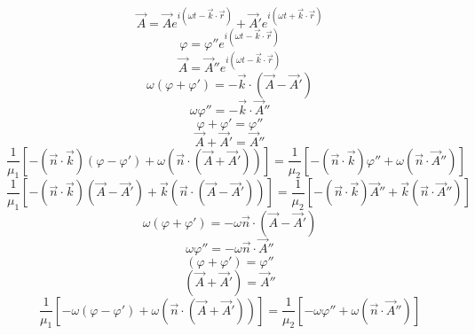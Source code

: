 \begin{equation}
    \vec{A}=\vec{A} e^{i(\omega t-\vec{k}\cdot\vec{r})}+\vec{A}' e^{i(\omega t+\vec{k}\cdot\vec{r})}
\end{equation}
\begin{equation}
    \varphi=\varphi''e^{i(\omega t-\vec{k}\cdot\vec{r})}
\end{equation}
\begin{equation}
    \vec{A}=\vec{A}''e^{i(\omega t-\vec{k}\cdot\vec{r})}
\end{equation}
\begin{equation}
    \omega(\varphi+\varphi')=-\vec{k}\cdot(\vec{A}-\vec{A}')
\end{equation}
\begin{equation}
    \omega\varphi''=-\vec{k}\cdot\vec{A}''
\end{equation}
\begin{equation}
    \varphi+\varphi'=\varphi''
\end{equation}
\begin{equation}
    \vec{A}+\vec{A}'=\vec{A}''
\end{equation}
\begin{equation}
    \frac{1}{\mu_1}[-(\vec{n}\cdot\vec{k})(\varphi-\varphi')+\omega(\vec{n}\cdot(\vec{A}+\vec{A}'))]=\frac{1}{\mu_2}[-(\vec{n}\cdot\vec{k})\varphi''+\omega(\vec{n}\cdot\vec{A}'')]
\end{equation}
\begin{equation}
    \frac{1}{\mu_1}[-(\vec{n}\cdot\vec{k})(\vec{A}-\vec{A}')+\vec{k}(\vec{n}\cdot(\vec{A}-\vec{A}'))]=\frac{1}{\mu_2}[-(\vec{n}\cdot\vec{k})\vec{A}''+\vec{k}(\vec{n}\cdot\vec{A}'')]
\end{equation}
\begin{equation}
    \omega(\varphi+\varphi')=-\omega\vec{n}\cdot(\vec{A}-\vec{A}')
\end{equation}
\begin{equation}
    \omega\varphi''=-\omega\vec{n}\cdot\vec{A}''
\end{equation}
\begin{equation}
    (\varphi+\varphi')=\varphi''
\end{equation}
\begin{equation}
    (\vec{A}+\vec{A}')=\vec{A}''
\end{equation}
\begin{equation}
    \frac{1}{\mu_1}[-\omega(\varphi-\varphi')+\omega(\vec{n}\cdot(\vec{A}+\vec{A}'))]=\frac{1}{\mu_2}[-\omega\varphi''+\omega(\vec{n}\cdot\vec{A}'')]
\end{equation}
